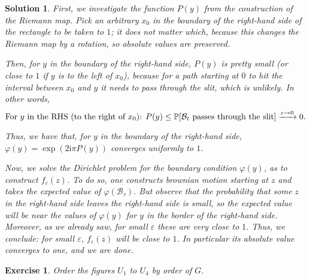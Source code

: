 \documentclass{article}
\newtheorem{ex}{Exercise}
\theoremstyle{nonumberplain}
\newtheorem{sol}{Solution}
\newcommand{\I}{\mathrm{i}}
\DeclarePairedDelimiter{\bparens}{[}{]}
\newcommand{\PPg}{\mathbb{P}}
\newcommand{\PP}{\PPg\bparens}
\newcommand{\Brwn}{\mathcal{B}}
\begin{document}
\begin{sol}
First, we investigate the function $P(y)$ from the construction of the Riemann map. Pick an arbitrary $x_0$ in the boundary of the right-hand side of the rectangle to be taken to $1$; it does not matter which, because this changes the Riemann map by a rotation, so absolute values are preserved.

Then, for $y$ in the boundary of the right-hand side, $P(y)$ is pretty small (or close to $1$ if $y$ is to the left of $x_0$), because for a path starting at $0$ to hit the interval between $x_0$ and $y$ it needs to pass through the slit, which is unlikely. In other words,
\begin{equation}
\text{For $y$ in the RHS (to the right of $x_0$): } P(y) \leq \PP{\text{$\Brwn_t$ passes through the slit}} \xrightarrow{\varepsilon \to 0} 0.
\end{equation}

Thus, we have that, for $y$ in the boundary of the right-hand side, $\varphi(y) = \exp(2\I\pi P(y))$ converges uniformly to $1$.

Now, we solve the Dirichlet problem for the boundary condition $\varphi(y)$, as to construct $f_\varepsilon(z)$. To do so, one constructs brownian motion starting at $z$ and takes the expected value of $\varphi(\Brwn_\tau)$. But observe that the probability that some $z$ in the right-hand side leaves the right-hand side is small, so the expected value will be near the values of $\varphi(y)$ for $y$ in the border of the right-hand side. Moreover, as we already saw, for small $\varepsilon$ these are very close to $1$. Thus, we conclude: for small $\varepsilon$, $f_\varepsilon(z)$ will be close to $1$. In particular its absolute value converges to one, and we are done.
\end{sol}

\begin{ex}
Order the figures $U_1$ to $U_4$ by order of $G$.
\end{ex}
\end{document}
